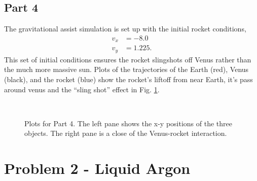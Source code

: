 \documentclass[singlepage,notitlepage,nofootinbib,11pt]{revtex4-1}
\begin{document}
\subsection{Part 4}
The gravitational assist simulation is set up with the initial rocket conditions,
\begin{align*}
v_x &= -8.0 \\
v_y &= 1.225.
\end{align*}
This set of initial conditions ensures the rocket slingshots off Venus rather than the much more massive sun. Plots of the trajectories of the Earth (red), Venus (black), and the rocket (blue) show the rocket's liftoff from near Earth, it's pass around venus and the ``sling shot'' effect in Fig. \ref{fig4}.
\begin{figure}[h]
  \centering
  \\
\hfill
  \caption{\label{fig4} Plots for Part 4. The left pane shows the x-y positions of the three objects. The right pane is a close of the Venus-rocket interaction.}
\end{figure}
\clearpage
\section{Problem 2 - Liquid Argon}
\end{document}
